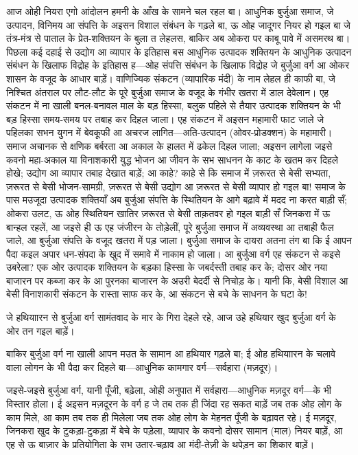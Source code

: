 \documentclass[12pt,a4paper,oneside]{book}
\begin{document}
आज ओही नियरा एगो आंदोलन हमनी के आँख के सामने चल रहल बा। आधुनिक बुर्जुआ समाज, जे उत्पादन, विनिमय आ संपत्ति के अइसन विशाल संबंधन के गढ़ले बा, ऊ ओह जादूगर नियर हो गइल बा जे तंत्र-मंत्र से पाताल के प्रेत-शक्तियन के बुला त लेहलस, बाकिर अब ओकरा पर काबू पावे में असमरथ बा। पिछला कई दहाई से उद्योग आ व्यापार के इतिहास बस आधुनिक उत्पादक शक्तियन के आधुनिक उत्पादन संबंधन के खिलाफ विद्रोह के इतिहास ह—ओह संपत्ति संबंधन के खिलाफ विद्रोह जे बुर्जुआ वर्ग आ ओकर शासन के वजूद के आधार बाड़ें। वाणिज्यिक संकटन (व्यापारिक मंदी) के नाम लेहल ही काफी बा, जे निश्चित अंतराल पर लौट-लौट के पूरे बुर्जुआ समाज के वजूद के गंभीर खतरा में डाल देवेलान। एह संकटन में ना खाली बनल-बनावल माल के बड़ हिस्सा, बलुक पहिले से तैयार उत्पादक शक्तियन के भी बड़ हिस्सा समय-समय पर तबाह कर दिहल जाला। एह संकटन में अइसन महामारी फाट जाले जे पहिलका सभन युगन में बेवकूफी आ अचरज लागित—अति-उत्पादन (ओवर-प्रोडक्शन) के महामारी। समाज अचानक से क्षणिक बर्बरता आ अकाल के हालत में ढकेल दिहल जाला; अइसन लागेला जइसे कवनो महा-अकाल या विनाशकारी युद्ध भोजन आ जीवन के सभ साधनन के काट के खतम कर दिहले होखे; उद्योग आ व्यापार तबाह देखात बाड़ें; आ काहे? काहे से कि समाज में ज़रूरत से बेसी सभ्यता, ज़रूरत से बेसी भोजन-सामग्री, ज़रूरत से बेसी उद्योग आ ज़रूरत से बेसी व्यापार हो गइल बा! समाज के पास मउजूदा उत्पादक शक्तियाँ अब बुर्जुआ संपत्ति के स्थितियन के आगे बढ़ावे में मदद ना करत बाड़ी सँ; ओकरा उलट, ऊ ओह स्थितियन खातिर ज़रूरत से बेसी ताक़तवर हो गइल बाड़ी सँ जिनकरा में ऊ बान्हल रहलें, आ जइसे ही ऊ एह जंजीरन के तोड़ेलीं, पूरे बुर्जुआ समाज में अव्यवस्था आ तबाही फैल जाले, आ बुर्जुआ संपत्ति के वजूद खतरा में पड़ जाला। बुर्जुआ समाज के दायरा अतना तंग बा कि ई आपन पैदा कइल अपार धन-संपदा के खुद में समावे में नाकाम हो जाला। आ बुर्जुआ वर्ग एह संकटन से कइसे उबरेला? एक ओर उत्पादक शक्तियन के बड़का हिस्सा के जबर्दस्ती तबाह कर के; दोसर ओर नया बाजारन पर कब्जा कर के आ पुरनका बाजारन के अउरी बेदर्दी से निचोड़ के। यानी कि, बेसी विशाल आ बेसी विनाशकारी संकटन के रास्ता साफ कर के, आ संकटन से बचे के साधनन के घटा के!

जे हथियाारन से बुर्जुआ वर्ग सामंतवाद के मार के गिरा देहले रहे, आज उहे हथियार खुद बुर्जुआ वर्ग के ओर तन गइल बाड़ें।

बाकिर बुर्जुआ वर्ग ना खाली आपन मउत के सामान आ हथियार गढ़ले बा; ई ओह हथियाारन के चलावे वाला लोगन के भी पैदा कर दिहले बा—आधुनिक कामगार वर्ग—सर्वहारा (मज़दूर)।

जइसे-जइसे बुर्जुआ वर्ग, यानी पूँजी, बढ़ेला, ओही अनुपात में सर्वहारा—आधुनिक मज़दूर वर्ग—के भी विस्तार होला। ई अइसन मज़दूरन के वर्ग ह जे तब तक ही जिंदा रह सकत बाड़ें जब तक ओह लोग के काम मिले, आ काम तब तक ही मिलेला जब तक ओह लोग के मेहनत पूँजी के बढ़ावत रहे। ई मज़दूर, जिनकरा खुद के टुकड़ा-टुकड़ा में बेचे के पड़ेला, व्यापार के कवनो दोसर सामान (माल) नियर बाड़ें, आ एह से ऊ बाज़ार के प्रतियोगिता के सभ उतार-चढ़ाव आ मंदी-तेज़ी के थपेड़न का शिकार बाड़ें।
\end{document}
